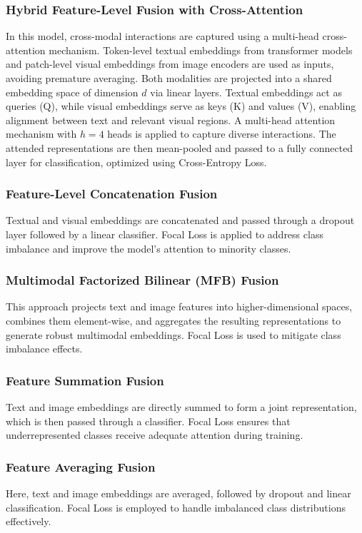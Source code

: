 \documentclass[11pt]{article}
\begin{document}
\subsubsection{Hybrid Feature-Level Fusion with Cross-Attention} 
In this model, cross-modal interactions are captured using a multi-head cross-attention mechanism. Token-level textual embeddings from transformer models and patch-level visual embeddings from image encoders are used as inputs, avoiding premature averaging. Both modalities are projected into a shared embedding space of dimension $d$ via linear layers. Textual embeddings act as queries (Q), while visual embeddings serve as keys (K) and values (V), enabling alignment between text and relevant visual regions. A multi-head attention mechanism with $h=4$ heads is applied to capture diverse interactions. The attended representations are then mean-pooled and passed to a fully connected layer for classification, optimized using Cross-Entropy Loss.

\subsubsection{Feature-Level Concatenation Fusion} 
Textual and visual embeddings are concatenated and passed through a dropout layer followed by a linear classifier. Focal Loss is applied to address class imbalance and improve the model’s attention to minority classes.

\subsubsection{Multimodal Factorized Bilinear (MFB) Fusion} 
This approach projects text and image features into higher-dimensional spaces, combines them element-wise, and aggregates the resulting representations to generate robust multimodal embeddings. Focal Loss is used to mitigate class imbalance effects.

\subsubsection{Feature Summation Fusion} 
Text and image embeddings are directly summed to form a joint representation, which is then passed through a classifier. Focal Loss ensures that underrepresented classes receive adequate attention during training.

\subsubsection{Feature Averaging Fusion} 
Here, text and image embeddings are averaged, followed by dropout and linear classification. Focal Loss is employed to handle imbalanced class distributions effectively.
\end{document}
